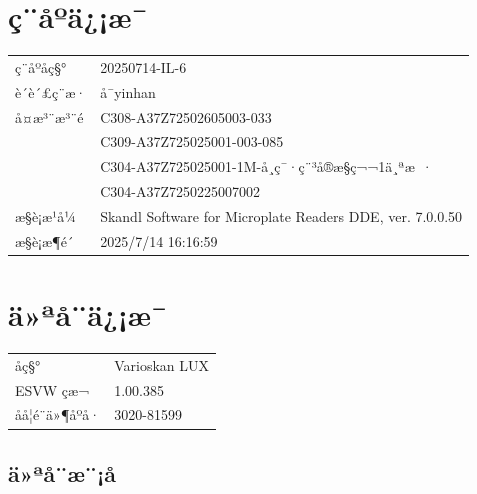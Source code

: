 \documentclass[UTF8,10pt,a4paper,fontset=fandol]{ctexart}
\newcommand{\fieldvalue}[1]{#1}
\begin{document}
\section*{ç¨åºä¿¡æ¯}

\begin{tabular}{ll}
ç¨åºåç§° &
\fieldvalue{20250714-IL-6}\\
è´è´£ç¨æ· &
\fieldvalue{å¯yinhan}\\
å¤æ³¨æ³¨é &
\fieldvalue{C308-A37Z72502605003-033}\\
&
\fieldvalue{C309-A37Z725025001-003-085}\\
&
\fieldvalue{C304-A37Z725025001-1M-å¸ç¯·ç¨³å®æ§ç¬¬1ä¸ªæ ·}\\
&
\fieldvalue{C304-A37Z7250225007002}\\
æ§è¡æ¹å¼ &
\fieldvalue{Skandl Software for Microplate Readers DDE, ver. 7.0.0.50}\\
æ§è¡æ¶é´ &
\fieldvalue{2025/7/14 16:16:59}
\end{tabular}

\section*{ä»ªå¨ä¿¡æ¯}

\begin{tabular}{ll}
åç§° &
\fieldvalue{Varioskan LUX}\\
ESVW çæ¬ &
\fieldvalue{1.00.385}\\
åå­¦é¨ä»¶åºå· &
\fieldvalue{3020-81599}
\end{tabular}

\subsection*{ä»ªå¨æ¨¡å}
\end{document}
